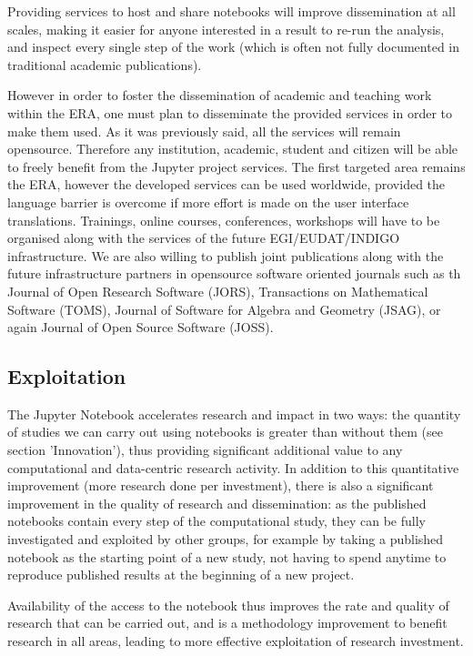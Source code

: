 Providing services to host and share notebooks will improve
dissemination at all scales, making it easier for anyone interested in
a result to re-run the analysis, and inspect every single step of the
work (which is often not fully documented in traditional academic
publications).

However in order to foster the dissemination of academic and teaching work within the ERA,
one must plan to disseminate the provided services in order to make them used.
As it was previously said, all the services will remain opensource. Therefore any
institution, academic, student and citizen will be able to freely benefit from the 
Jupyter project services. The first targeted area remains the ERA, however the developed
services can be used worldwide, provided the language barrier is overcome if more effort is
made on the user interface translations.
Trainings, online courses, conferences, workshops will have to be organised along with the
services of the future EGI/EUDAT/INDIGO infrastructure.
We are also willing to publish joint publications along with the future infrastructure
partners in opensource software oriented journals such as th Journal of Open Research
Software (JORS), Transactions on Mathematical Software (TOMS), Journal of Software for
Algebra and Geometry (JSAG), or again Journal of Open Source Software (JOSS).


\subsection{Exploitation}

The Jupyter Notebook accelerates research and impact in two ways: the
quantity of studies we can carry out using notebooks is greater than
without them (see section 'Innovation'), thus providing significant
additional value to any computational and data-centric research
activity. In addition to this quantitative improvement (more research
done per investment), there is also a significant improvement in the
quality of research and dissemination: as the published notebooks
contain every step of the computational study, they can be fully
investigated and exploited by other groups, for example by taking a
published notebook as the starting point of a new study, not having to
spend anytime to reproduce published results at the beginning of a new
project. 

Availability of the access to the notebook thus improves the rate and
quality of research that can be carried out, and is a methodology
improvement to benefit research in all areas, leading to more
effective exploitation of research investment.


